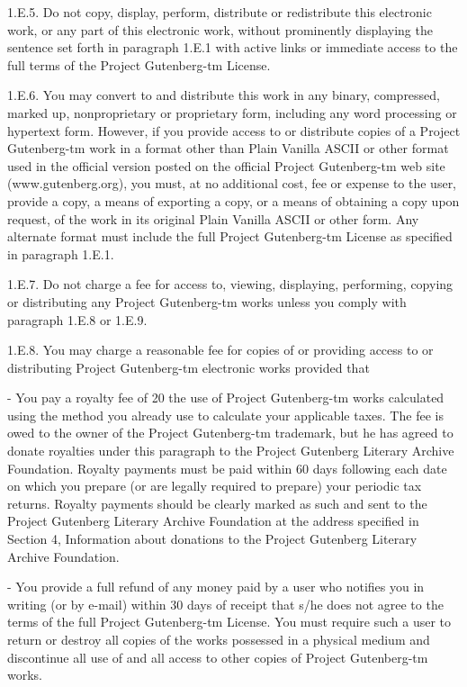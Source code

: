 \documentclass[twocolumn]{article}
\begin{document}
1.E.5.  Do not copy, display, perform, distribute or redistribute this
electronic work, or any part of this electronic work, without
prominently displaying the sentence set forth in paragraph 1.E.1 with
active links or immediate access to the full terms of the Project
Gutenberg-tm License.

1.E.6.  You may convert to and distribute this work in any binary,
compressed, marked up, nonproprietary or proprietary form, including any
word processing or hypertext form.  However, if you provide access to or
distribute copies of a Project Gutenberg-tm work in a format other than
Plain Vanilla ASCII or other format used in the official version
posted on the official Project Gutenberg-tm web site (www.gutenberg.org),
you must, at no additional cost, fee or expense to the user, provide a
copy, a means of exporting a copy, or a means of obtaining a copy upon
request, of the work in its original Plain Vanilla ASCII or other
form.  Any alternate format must include the full Project Gutenberg-tm
License as specified in paragraph 1.E.1.

1.E.7.  Do not charge a fee for access to, viewing, displaying,
performing, copying or distributing any Project Gutenberg-tm works
unless you comply with paragraph 1.E.8 or 1.E.9.

1.E.8.  You may charge a reasonable fee for copies of or providing
access to or distributing Project Gutenberg-tm electronic works provided
that

- You pay a royalty fee of 20%
     the use of Project Gutenberg-tm works calculated using the method
     you already use to calculate your applicable taxes.  The fee is
     owed to the owner of the Project Gutenberg-tm trademark, but he
     has agreed to donate royalties under this paragraph to the
     Project Gutenberg Literary Archive Foundation.  Royalty payments
     must be paid within 60 days following each date on which you
     prepare (or are legally required to prepare) your periodic tax
     returns.  Royalty payments should be clearly marked as such and
     sent to the Project Gutenberg Literary Archive Foundation at the
     address specified in Section 4, Information about donations to
     the Project Gutenberg Literary Archive Foundation.

- You provide a full refund of any money paid by a user who notifies
     you in writing (or by e-mail) within 30 days of receipt that s/he
     does not agree to the terms of the full Project Gutenberg-tm
     License.  You must require such a user to return or
     destroy all copies of the works possessed in a physical medium
     and discontinue all use of and all access to other copies of
     Project Gutenberg-tm works.
\end{document}
